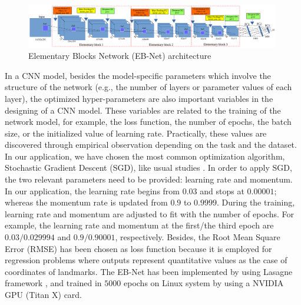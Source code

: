\documentclass[review]{elsarticle}
\begin{document}

\begin{figure}[h!]
	\centering
	\includegraphics[width=0.99\textwidth]{images/arch_model}
	\caption{Elementary Blocks Network (EB-Net) architecture}
	\label{figebnet}
\end{figure}

In a CNN model, besides the model-specific parameters which involve the structure of the network (e.g., the number of layers or parameter values of each layer), the optimized hyper-parameters are also important variables in the designing of a CNN model. These variables are related to the training of the network model, for example, the loss function, the number of epochs, the batch size, or the initialized value of learning rate. Practically, these values are discovered through empirical observation depending on the task and the dataset. In our application, we have chosen the most common optimization algorithm, Stochastic Gradient Descent (SGD), like usual studies \cite{krizhevsky2012imagenet, cintas2016automatic}. In order to apply SGD, the two relevant parameters need to be provided: learning rate and momentum. In our application, the learning rate begins from $0.03$ and stops at $0.00001$; whereas the momentum rate is updated from $0.9$ to $0.9999$. During the training, learning rate and momentum are adjusted to fit with the number of epochs. For example, the learning rate and momentum at the first/the third epoch are $0.03/ 0.029994$ and $0.9/0.90001$, respectively. Besides, the Root Mean Square Error (RMSE) has been chosen as loss function because it is employed for regression problems where outputs represent quantitative values as the case of coordinates of landmarks. The EB-Net has been implemented by using Lasagne framework \cite{lasagne}, and trained in $5000$ epochs on Linux system by using a NVIDIA GPU (Titan X) card.
\end{document}
